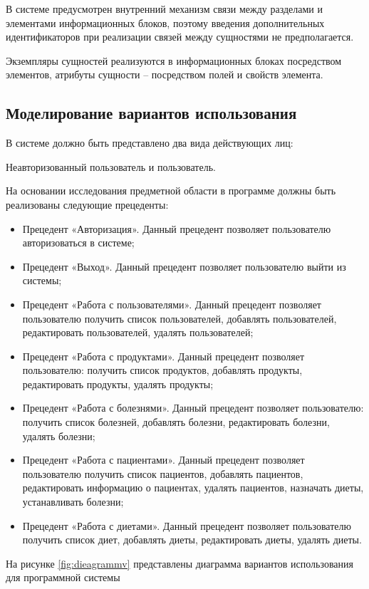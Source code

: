 В системе предусмотрен внутренний механизм связи между разделами и элементами информационных блоков, поэтому введения дополнительных идентификаторов при реализации связей между сущностями не предполагается.

Экземпляры сущностей реализуются в информационных блоках посредством элементов, атрибуты сущности – посредством полей и свойств элемента. 

\subsection{Моделирование вариантов использования}

В системе должно быть представлено два вида действующих лиц:

Неавторизованный пользователь и пользователь.

На основании исследования предметной области в программе должны быть реализованы следующие прецеденты:

\begin{itemize}
	\item Прецедент «Авторизация». Данный прецедент позволяет пользователю авторизоваться в системе;
	\item Прецедент «Выход». Данный прецедент позволяет пользователю выйти из системы;
	\item Прецедент «Работа с пользователями». Данный прецедент позволяет пользователю получить список пользователей, добавлять пользователей, редактировать пользователей, удалять пользователей;
	\item Прецедент «Работа с продуктами». Данный прецедент позволяет пользователю: получить список продуктов, добавлять продукты, редактировать продукты, удалять продукты;
	\item Прецедент «Работа с болезнями». Данный прецедент позволяет пользователю: получить список болезней, добавлять болезни, редактировать болезни, удалять болезни;
	\item Прецедент «Работа с пациентами». Данный прецедент позволяет пользователю получить список пациентов, добавлять пациентов, редактировать информацию о пациентах, удалять пациентов, назначать диеты, устанавливать болезни;
	\item Прецедент «Работа с диетами». Данный прецедент позволяет пользователю получить список диет, добавлять диеты, редактировать диеты, удалять диеты.
\end{itemize}

На рисунке \ref{fig:dieagrammv} представлены диаграмма вариантов использования для программной системы

